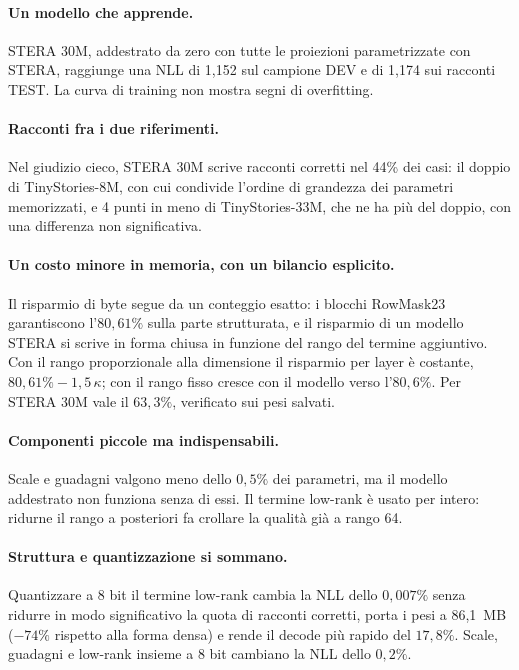 \paragraph{Un modello che apprende.} STERA 30M, addestrato da zero con tutte le proiezioni parametrizzate con STERA, raggiunge una NLL di 1,152 sul campione DEV e di 1,174 sui racconti TEST. La curva di training non mostra segni di overfitting.

\paragraph{Racconti fra i due riferimenti.} Nel giudizio cieco, STERA 30M scrive racconti corretti nel 44\% dei casi: il doppio di TinyStories-8M, con cui condivide l'ordine di grandezza dei parametri memorizzati, e 4 punti in meno di TinyStories-33M, che ne ha più del doppio, con una differenza non significativa.

\paragraph{Un costo minore in memoria, con un bilancio esplicito.} Il risparmio di byte segue da un conteggio esatto: i blocchi RowMask23 garantiscono l'$80{,}61\%$ sulla parte strutturata, e il risparmio di un modello STERA si scrive in forma chiusa in funzione del rango del termine aggiuntivo. Con il rango proporzionale alla dimensione il risparmio per layer è costante, $80{,}61\%-1{,}5\,\kappa$; con il rango fisso cresce con il modello verso l'$80{,}6\%$. Per STERA 30M vale il $63{,}3\%$, verificato sui pesi salvati.

\paragraph{Componenti piccole ma indispensabili.} Scale e guadagni valgono meno dello $0{,}5\%$ dei parametri, ma il modello addestrato non funziona senza di essi. Il termine low-rank è usato per intero: ridurne il rango a posteriori fa crollare la qualità già a rango 64.

\paragraph{Struttura e quantizzazione si sommano.} Quantizzare a 8 bit il termine low-rank cambia la NLL dello $0{,}007\%$ senza ridurre in modo significativo la quota di racconti corretti, porta i pesi a 86,1~MB ($-74\%$ rispetto alla forma densa) e rende il decode più rapido del $17{,}8\%$. Scale, guadagni e low-rank insieme a 8 bit cambiano la NLL dello $0{,}2\%$.


